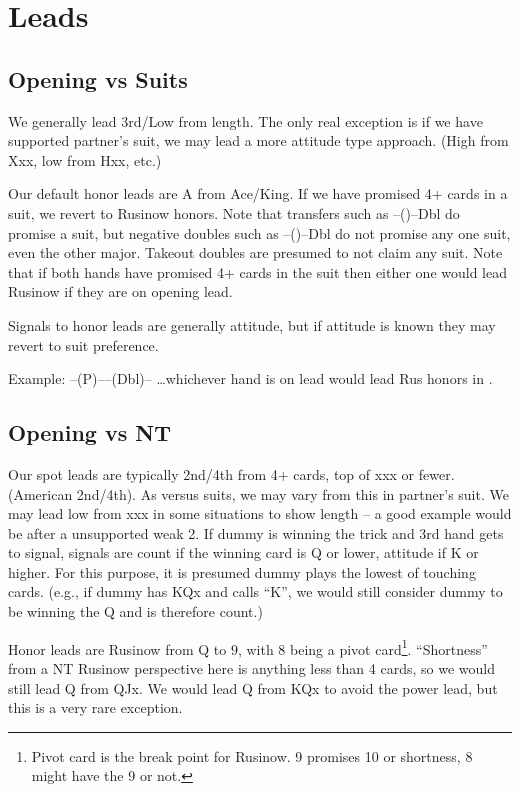 \documentclass[tom-ari]{subfiles}
\begin{document}
\chapter{Leads}

\section{Opening vs Suits}

We generally lead 3rd/Low from length.  The only real exception is if we have supported partner's suit, we may lead a more attitude type approach. (High from Xxx, low from Hxx, etc.)

Our default honor leads are A from Ace/King.  If we have promised 4+ cards in a suit, we revert to Rusinow honors. Note that transfers such as --()--Dbl do promise a suit, but negative doubles such as --()--Dbl do not promise any one suit, even the other major.  Takeout doubles are presumed to not claim any suit.  Note that if both hands have promised 4+ cards in the suit then either one would lead Rusinow if they are on opening lead.

Signals to honor leads are generally attitude, but if attitude is known they may revert to suit preference.

Example: --(P)----(Dbl)-- \ldots whichever hand is on lead would lead Rus honors in \hhh. 

\section{Opening vs NT}

Our spot leads are typically 2nd/4th from 4+ cards, top of xxx or fewer. (American 2nd/4th).  As versus suits, we may vary from this in partner's suit. We may lead low from xxx in some situations to show length -- a good example would be after a unsupported weak 2. If dummy is winning the trick and 3rd hand gets to signal, signals are count if the winning card is Q or lower, attitude if K or higher. For this purpose, it is presumed dummy plays the lowest of touching cards.  (e.g., if dummy has KQx and calls ``K'', we would still consider dummy to be winning the Q and is therefore count.)

Honor leads are Rusinow from Q to 9, with 8 being a pivot card\footnote{Pivot card is the break point for Rusinow. 9 promises 10 or shortness, 8 might have the 9 or not.}. ``Shortness'' from a NT Rusinow perspective here is anything less than 4 cards, so we would still lead Q from QJx. We would lead Q from KQx to avoid the power lead, but this is a very rare exception.  
\end{document}
